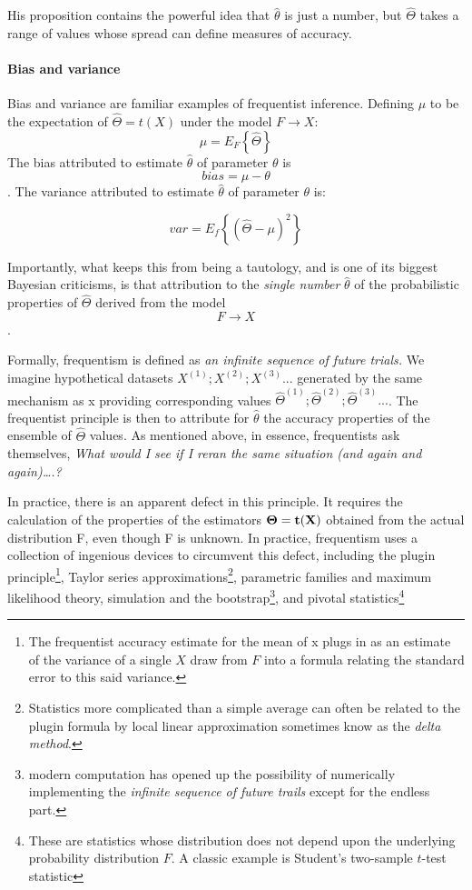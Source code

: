 \documentclass{article}
\begin{document}
His proposition contains the powerful idea that \(\hat{\theta}\) is just
a number, but \(\hat{\Theta}\) takes a range of values whose spread can
define measures of accuracy.

\hypertarget{bias-and-variance}{%
\paragraph{Bias and variance}\label{bias-and-variance}}

Bias and variance are familiar examples of frequentist inference.
Defining \(\mu\) to be the expectation of \(\hat{\Theta}=t(X)\) under
the model \(F \to X\): \[\mu=E_F\left\{\hat{\Theta}\right\}\] The bias
attributed to estimate \(\hat{\theta}\) of parameter \(\theta\) is
\[bias=\mu - \theta\]. The variance attributed to estimate
\(\hat{\theta}\) of parameter \(\theta\) is:

\[var=E_f\left\{(\hat{\Theta}-\mu)^2\right\}\]

Importantly, what keeps this from being a tautology, and is one of its
biggest Bayesian criticisms, is that attribution to the \emph{single
number} \(\hat{\theta}\) of the probabilistic properties of
\(\hat{\Theta}\) derived from the model \[F \to X\].

Formally, frequentism is defined as \emph{an infinite sequence of future
trials.} We imagine hypothetical datasets \(X^{(1)};X^{(2)};X^{(3)}...\)
generated by the same mechanism as x providing corresponding values
\(\hat{\Theta}^{(1)};\hat{\Theta}^{(2)};\hat{\Theta}^{(3)}...\). The
frequentist principle is then to attribute for \(\hat{\theta}\) the
accuracy properties of the ensemble of \(\hat{\Theta}\) values. As
mentioned above, in essence, frequentists ask themselves, \emph{What
would I see if I reran the same situation (and again and again)\ldots.?}

In practice, there is an apparent defect in this principle. It requires
the calculation of the properties of the estimators \(\bf{\Theta}=t(X)\)
obtained from the actual distribution F, even though F is unknown. In
practice, frequentism uses a collection of ingenious devices to
circumvent this defect, including the plugin principle\footnote{The
  frequentist accuracy estimate for the mean of x plugs in as an
  estimate of the variance of a single \(X\) draw from \(F\) into a
  formula relating the standard error to this said variance.}, Taylor
series approximations\footnote{ Statistics more complicated than a
  simple average can often be related to the plugin formula by local
  linear approximation sometimes know as the \emph{delta method}.},
parametric families and maximum likelihood theory, simulation and the
bootstrap\footnote{modern computation has opened up the possibility of
  numerically implementing the \emph{infinite sequence of future trails}
  except for the endless part.}, and pivotal statistics\footnote{These
  are statistics whose distribution does not depend upon the underlying
  probability distribution \(F\). A classic example is Student's
  two-sample \(t\)-test statistic}
\end{document}
